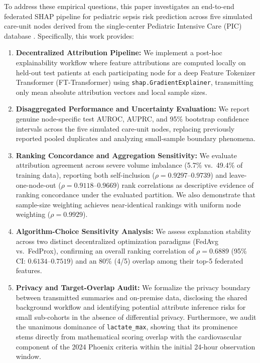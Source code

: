 \documentclass[runningheads]{llncs}
\begin{document}
To address these empirical questions, this paper investigates an end-to-end federated SHAP pipeline for pediatric sepsis risk prediction across five simulated care-unit nodes derived from the single-center Pediatric Intensive Care (PIC) database \cite{zeng2020pic}. Specifically, this work provides:
\begin{enumerate}
\item \textbf{Decentralized Attribution Pipeline:} We implement a post-hoc explainability workflow where feature attributions are computed locally on held-out test patients at each participating node for a deep Feature Tokenizer Transformer (FT-Transformer) using \texttt{shap.GradientExplainer}, transmitting only mean absolute attribution vectors and local sample sizes.
\item \textbf{Disaggregated Performance and Uncertainty Evaluation:} We report genuine node-specific test AUROC, AUPRC, and 95\% bootstrap confidence intervals across the five simulated care-unit nodes, replacing previously reported pooled duplicates and analyzing small-sample boundary phenomena.
\item \textbf{Ranking Concordance and Aggregation Sensitivity:} We evaluate attribution agreement across severe volume imbalance (5.7\% vs.\ 49.4\% of training data), reporting both self-inclusion ($\rho = 0.9297$--$0.9739$) and leave-one-node-out ($\rho = 0.9118$--$0.9669$) rank correlations as descriptive evidence of ranking concordance under the evaluated partition. We also demonstrate that sample-size weighting achieves near-identical rankings with uniform node weighting ($\rho = 0.9929$).
\item \textbf{Algorithm-Choice Sensitivity Analysis:} We assess explanation stability across two distinct decentralized optimization paradigms (FedAvg vs.\ FedProx), confirming an overall ranking correlation of $\rho = 0.6889$ (95\% CI: $0.6134$--$0.7519$) and an 80\% (4/5) overlap among their top-5 federated features.
\item \textbf{Privacy and Target-Overlap Audit:} We formalize the privacy boundary between transmitted summaries and on-premise data, disclosing the shared background workflow and identifying potential attribute inference risks for small sub-cohorts in the absence of differential privacy. Furthermore, we audit the unanimous dominance of \texttt{lactate\_max}, showing that its prominence stems directly from mathematical scoring overlap with the cardiovascular component of the 2024 Phoenix criteria within the initial 24-hour observation window.
\end{enumerate}
\end{document}

